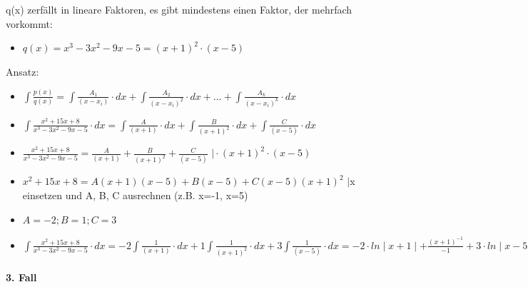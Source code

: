 q(x) zerfällt in lineare Faktoren, es gibt mindestens einen Faktor,
der mehrfach vorkommt:
\begin{itemize}
\item $q(x)=x^{3}-3x^{2}-9x-5=(x+1)^{2}\cdot(x-5)$
\end{itemize}
Ansatz:
\begin{itemize}
\item $\int\frac{p(x)}{q(x)}=\int\frac{A_{1}}{(x-x_{i})}\cdot dx+\int\frac{A_{2}}{(x-x_{i})^{2}}\cdot dx+...+\int\frac{A_{k}}{(x-x_{i})^{k}}\cdot dx$
\item $\int\frac{x^{2}+15x+8}{x^{3}-3x^{2}-9x-5}\cdot dx=\int\frac{A}{(x+1)}\cdot dx+\int\frac{B}{(x+1)^{2}}\cdot dx+\int\frac{C}{(x-5)}\cdot dx$
\item $\frac{x^{2}+15x+8}{x^{3}-3x^{2}-9x-5}=\frac{A}{(x+1)}+\frac{B}{(x+1)^{2}}+\frac{C}{(x-5)}$
$\mid\cdot(x+1)^{2}\cdot(x-5)$
\item $x^{2}+15x+8=A(x+1)(x-5)+B(x-5)+C(x-5)(x+1)^{2}$ $\mid$x einsetzen
und A, B, C ausrechnen (z.B. x=-1, x=5)
\item $A=-2;B=1;C=3$
\item $\int\frac{x^{2}+15x+8}{x^{3}-3x^{2}-9x-5}\cdot dx=-2\int\frac{1}{(x+1)}\cdot dx+1\int\frac{1}{(x+1)^{2}}\cdot dx+3\int\frac{1}{(x-5)}\cdot dx=-2\cdot ln\mid x+1\mid+\frac{(x+1)^{-1}}{-1}+3\cdot ln\mid x-5\mid+C$
\end{itemize}

\paragraph*{3. Fall}

